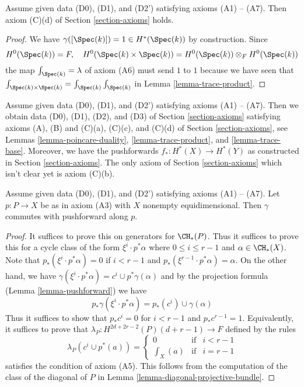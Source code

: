 \begin{lemma}
\label{lemma-trace-base}
Assume given data (D0), (D1), and (D2') satisfying axioms (A1) -- (A7).
Then axiom (C)(d) of Section \ref{section-axioms} holds.
\end{lemma}

\begin{proof}
We have $\gamma([\Spec(k)]) = 1 \in H^*(\Spec(k))$ by construction.
Since
$$
H^0(\Spec(k)) = F,\quad
H^0(\Spec(k) \times \Spec(k)) = H^0(\Spec(k)) \otimes_F H^0(\Spec(k))
$$
the map $\int_{\Spec(k)} = \lambda$ of axiom (A6) must send $1$ to $1$
because we have seen that
$\int_{\Spec(k) \times \Spec(k)} = \int_{\Spec(k)} \int_{\Spec(k)}$
in Lemma \ref{lemma-trace-product}.
\end{proof}

\noindent
Assume given data (D0), (D1), and (D2') satisfying axioms (A1) -- (A7).
Then we obtain data (D0), (D1), (D2), and (D3) of
Section \ref{section-axioms}
satisfying axioms (A), (B) and (C)(a), (C)(c), and (C)(d)
of Section \ref{section-axioms}, see
Lemmas \ref{lemma-poincare-duality}, \ref{lemma-trace-product}, and
\ref{lemma-trace-base}.
Moreover, we have the pushforwards $f_* : H^*(X) \to H^*(Y)$
as constructed in Section \ref{section-axioms}. The only axiom of
Section \ref{section-axioms}
which isn't clear yet is axiom (C)(b).

\begin{lemma}
\label{lemma-ok-for-projective-bundle}
Assume given data (D0), (D1), and (D2') satisfying axioms (A1) -- (A7).
Let $p : P \to X$ be as in axiom (A3) with $X$ nonempty equidimensional.
Then $\gamma$ commutes with pushforward along $p$.
\end{lemma}

\begin{proof}
It suffices to prove this on generators for $\CH_*(P)$.
Thus it suffices to prove this for a cycle class of the
form $\xi^i \cdot p^*\alpha$ where $0 \leq i \leq r - 1$
and $\alpha \in \CH_*(X)$. Note that $p_*(\xi^i \cdot p^*\alpha) = 0$
if $i < r - 1$ and $p_*(\xi^{r - 1} \cdot p^*\alpha) = \alpha$.
On the other hand, we have
$\gamma(\xi^i \cdot p^*\alpha) = c^i \cup p^*\gamma(\alpha)$
and by the projection formula (Lemma \ref{lemma-pushforward})
we have
$$
p_*\gamma(\xi^i \cdot p^*\alpha) = p_*(c^i) \cup \gamma(\alpha)
$$
Thus it suffices to show that $p_*c^i = 0$ for $i < r - 1$ and
$p_*c^{r - 1} = 1$. Equivalently, it suffices to prove that
$\lambda_P : H^{2d + 2r - 2}(P)(d + r - 1) \to F$ defined by
the rules
$$
\lambda_P(c^i \cup p^*(a)) =
\left\{
\begin{matrix}
0 & \text{if} & i < r - 1 \\
\int_X(a) & \text{if} & i = r - 1
\end{matrix}
\right.
$$
satisfies the condition of axiom (A5). This follows from the
computation of the class of the diagonal of $P$ in
Lemma \ref{lemma-diagonal-projective-bundle}.
\end{proof}

